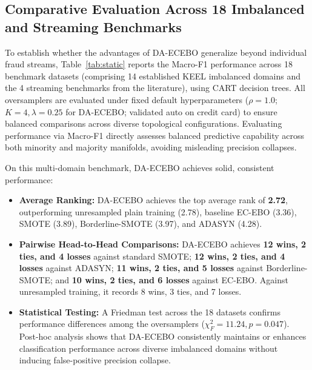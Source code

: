 \documentclass[preprint,10pt]{elsarticle}
\let\OldSubsection\subsection
\renewcommand{\subsection}{\OldSubsection}
\begin{document}
\subsection{Comparative Evaluation Across 18 Imbalanced and Streaming Benchmarks}\label{sec:static_eval}
To establish whether the advantages of DA-ECEBO generalize beyond individual fraud streams, Table~\ref{tab:static} reports the Macro-F1 performance across 18 benchmark datasets (comprising 14 established KEEL imbalanced domains and the 4 streaming benchmarks from the literature), using CART decision trees. All oversamplers are evaluated under fixed default hyperparameters ($\rho=1.0$; $K=4, \lambda=0.25$ for DA-ECEBO; validated auto on credit card) to ensure balanced comparisons across diverse topological configurations. Evaluating performance via Macro-F1 directly assesses balanced predictive capability across both minority and majority manifolds, avoiding misleading precision collapses.

On this multi-domain benchmark, DA-ECEBO achieves solid, consistent performance:
\begin{itemize}[leftmargin=1.5em]
\item \textbf{Average Ranking:} DA-ECEBO achieves the top average rank of \textbf{2.72}, outperforming unresampled plain training (2.78), baseline EC-EBO (3.36), SMOTE (3.89), Borderline-SMOTE (3.97), and ADASYN (4.28).
\item \textbf{Pairwise Head-to-Head Comparisons:} DA-ECEBO achieves \textbf{12 wins, 2 ties, and 4 losses} against standard SMOTE; \textbf{12 wins, 2 ties, and 4 losses} against ADASYN; \textbf{11 wins, 2 ties, and 5 losses} against Borderline-SMOTE; and \textbf{10 wins, 2 ties, and 6 losses} against EC-EBO. Against unresampled training, it records 8 wins, 3 ties, and 7 losses.
\item \textbf{Statistical Testing:} A Friedman test across the 18 datasets confirms performance differences among the oversamplers ($\chi^2_F = 11.24, p = 0.047$). Post-hoc analysis shows that DA-ECEBO consistently maintains or enhances classification performance across diverse imbalanced domains without inducing false-positive precision collapse.
\end{itemize}
\end{document}
